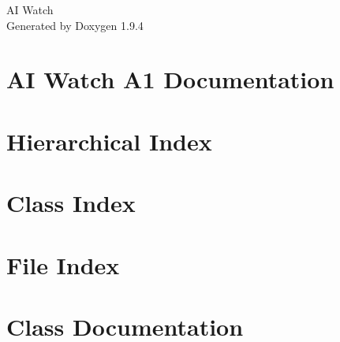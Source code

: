 \documentclass[twoside]{book}
\newcommand{\+}{\discretionary{\mbox{\scriptsize$\hookleftarrow$}}{}{}}
\newcommand{\clearemptydoublepage}{%
    \newpage{\pagestyle{empty}\cleardoublepage}%
  }
\begin{document}
  \raggedbottom
    \hypersetup{pageanchor=false,
                bookmarksnumbered=true,
                pdfencoding=unicode
               }
  \begin{titlepage}
  \vspace*{7cm}
  \begin{center}%
  {\Large AI Watch}\\
  \vspace*{1cm}
  {\large Generated by Doxygen 1.9.4}\\
  \end{center}
  \end{titlepage}
  \clearemptydoublepage
  \tableofcontents
  \clearemptydoublepage
  \hypersetup{pageanchor=true}
\chapter{AI Watch A1 Documentation}
\label{index}\hypertarget{index}{}
\chapter{Hierarchical Index}

\chapter{Class Index}

\chapter{File Index}

\chapter{Class Documentation}



















\end{document}
